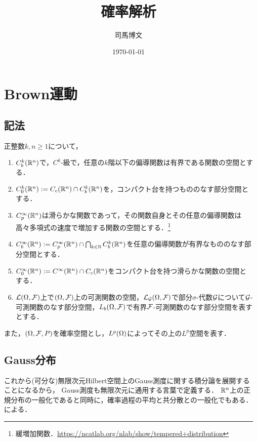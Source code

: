 \documentclass[uplatex,dvipdfmx]{jsreport}
\title{確率解析}
\author{司馬博文}
\date{\today}
\begin{document}
\tableofcontents

\chapter{Brown運動}



\section{記法}

\begin{notation}
    正整数$k,n\ge1$について，
    \begin{enumerate}
        \item $C_b^k(\mathbb{R}^n)$で，$C^k$-級で，任意の$k$階以下の偏導関数は有界である関数の空間とする．
        \item $C_0^k(\mathbb{R}^n):=C_c(\mathbb{R}^n)\cap C_b^k(\mathbb{R}^n)$を，コンパクト台を持つもののなす部分空間とする．
        \item $C_p^\infty(\mathbb{R}^n)$は滑らかな関数であって，その関数自身とその任意の偏導関数は高々多項式の速度で増加する関数の空間とする．\footnote{緩増加関数．\url{https://ncatlab.org/nlab/show/tempered+distribution}}
        \item $C_b^\infty(\mathbb{R}^n):=C_p^\infty(\mathbb{R}^n)\cap\bigcap_{k\in\mathbb{N}}C_b^k(\mathbb{R}^n)$を任意の偏導関数が有界なもののなす部分空間とする．
        \item $C_0^\infty(\mathbb{R}^n):=C^\infty(\mathbb{R}^n)\cap C_c(\mathbb{R}^n)$をコンパクト台を持つ滑らかな関数の空間とする．
        \item $\mathcal{L}(\Omega,\mathcal{F})$上で$(\Omega,\mathcal{F})$上の可測関数の空間，$\mathcal{L}_{\mathcal{G}}(\Omega,\mathcal{F})$で部分$\sigma$-代数$\mathcal{G}$について$\mathcal{G}$-可測関数のなす部分空間，$L_b(\Omega,\mathcal{F})$で有界$\mathcal{F}$-可測関数のなす部分空間を表すとする．
    \end{enumerate}
    また，$(\Omega,\mathcal{F},P)$を確率空間とし，$L^p(\Omega)$によってその上の$L^p$空間を表す．
\end{notation}

\section{Gauss分布}

\begin{tcolorbox}[colframe=ForestGreen, colback=ForestGreen!10!white,breakable,colbacktitle=ForestGreen!40!white,coltitle=black,fonttitle=\bfseries\sffamily,
title=]
    これから(可分な)無限次元Hilbert空間上のGauss測度に関する積分論を展開することになるから，
    Gauss測度も無限次元に通用する言葉で定義する．
    $\mathbb{R}^n$上の正規分布の一般化であると同時に，確率過程の平均と共分散との一般化でもある．
    \cite{Prato}による．
\end{tcolorbox}
\end{document}
